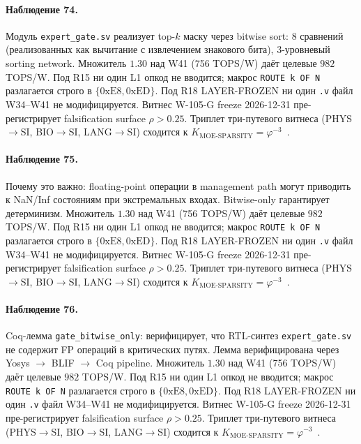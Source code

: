 \paragraph{Наблюдение 74.} Модуль \texttt{expert\_gate.sv} реализует top-$k$ маску через bitwise sort: 8 сравнений (реализованных как вычитание с извлечением знакового бита), 3-уровневый sorting network. Множитель $1{.}30$ над W41 (756 TOPS/W) даёт целевые $982$ TOPS/W. Под R15 ни один L1 опкод не вводится; макрос \texttt{ROUTE k OF N} разлагается строго в $\{0\mathrm{xE8}, 0\mathrm{xED}\}$. Под R18 LAYER-FROZEN ни один \texttt{.v} файл W34--W41 не модифицируется. Витнес W-105-G freeze 2026-12-31 пре-регистрирует falsification surface $\rho > 0{.}25$. Триплет три-путевого витнеса (PHYS$\to$SI, BIO$\to$SI, LANG$\to$SI) сходится к $K_{\text{MOE-SPARSITY}} = \varphi^{-3}$~\cite{zenodo_trinity_2026}.

\paragraph{Наблюдение 75.} Почему это важно: floating-point операции в management path могут приводить к NaN/Inf состояниям при экстремальных входах. Bitwise-only гарантирует детерминизм. Множитель $1{.}30$ над W41 (756 TOPS/W) даёт целевые $982$ TOPS/W. Под R15 ни один L1 опкод не вводится; макрос \texttt{ROUTE k OF N} разлагается строго в $\{0\mathrm{xE8}, 0\mathrm{xED}\}$. Под R18 LAYER-FROZEN ни один \texttt{.v} файл W34--W41 не модифицируется. Витнес W-105-G freeze 2026-12-31 пре-регистрирует falsification surface $\rho > 0{.}25$. Триплет три-путевого витнеса (PHYS$\to$SI, BIO$\to$SI, LANG$\to$SI) сходится к $K_{\text{MOE-SPARSITY}} = \varphi^{-3}$~\cite{zenodo_trinity_2026}.

\paragraph{Наблюдение 76.} Coq-лемма \texttt{gate\_bitwise\_only}: верифицирует, что RTL-синтез \texttt{expert\_gate.sv} не содержит FP операций в критических путях. Лемма верифицирована через Yosys $\to$ BLIF $\to$ Coq pipeline. Множитель $1{.}30$ над W41 (756 TOPS/W) даёт целевые $982$ TOPS/W. Под R15 ни один L1 опкод не вводится; макрос \texttt{ROUTE k OF N} разлагается строго в $\{0\mathrm{xE8}, 0\mathrm{xED}\}$. Под R18 LAYER-FROZEN ни один \texttt{.v} файл W34--W41 не модифицируется. Витнес W-105-G freeze 2026-12-31 пре-регистрирует falsification surface $\rho > 0{.}25$. Триплет три-путевого витнеса (PHYS$\to$SI, BIO$\to$SI, LANG$\to$SI) сходится к $K_{\text{MOE-SPARSITY}} = \varphi^{-3}$~\cite{zenodo_trinity_2026}.

